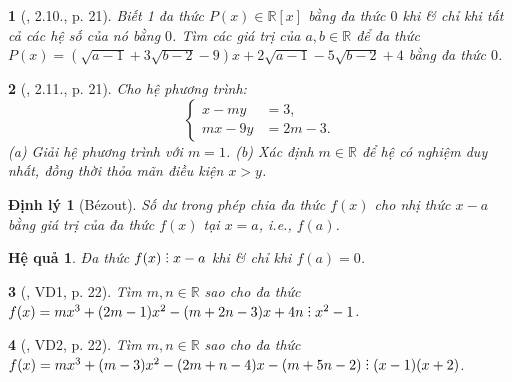 \documentclass{article}
\newtheorem{baitoan}{}
\newtheorem{dinhly}{Định lý}
\newtheorem{hequa}{Hệ quả}
\DeclareRobustCommand{\divby}{%
	\mathrel{\vbox{\baselineskip.65ex\lineskiplimit0pt\hbox{.}\hbox{.}\hbox{.}}}%
}
\begin{document}
\begin{baitoan}[\cite{Binh_boi_duong_Toan_9_tap_2}, 2.10., p. 21]
	Biết 1 đa thức $P(x)\in\mathbb{R}[x]$ bằng đa thức $0$ khi \& chỉ khi tất cả các hệ số của nó bằng $0$. Tìm các giá trị của $a,b\in\mathbb{R}$ để đa thức $P(x) = (\sqrt{a - 1} + 3\sqrt{b - 2} - 9)x + 2\sqrt{a - 1} - 5\sqrt{b - 2} + 4$ bằng đa thức $0$.
\end{baitoan}

\begin{baitoan}[\cite{Binh_boi_duong_Toan_9_tap_2}, 2.11., p. 21]
	Cho hệ phương trình:
	\begin{equation*}
		\left\{\begin{split}
			x - my &= 3,\\
			mx - 9y &= 2m - 3.
		\end{split}\right.
	\end{equation*}
	(a) Giải hệ phương trình với $m = 1$. (b) Xác định $m\in\mathbb{R}$ để hệ có nghiệm duy nhất, đồng thời thỏa mãn điều kiện $x > y$.
\end{baitoan}

\begin{dinhly}[B\'ezout]
	Số dư trong phép chia đa thức $f(x)$ cho nhị thức $x - a$ bằng giá trị của đa thức $f(x)$ tại $x = a$, i.e., $f(a)$.
\end{dinhly}

\begin{hequa}
	Đa thức $f(x)\divby x - a$ khi \& chỉ khi $f(a) = 0$.
\end{hequa}

\begin{baitoan}[\cite{Binh_boi_duong_Toan_9_tap_2}, VD1, p. 22]
	Tìm $m,n\in\mathbb{R}$ sao cho đa thức $f(x) = mx^3 + (2m - 1)x^2 - (m + 2n - 3)x + 4n\divby x^2 - 1$.
\end{baitoan}

\begin{baitoan}[\cite{Binh_boi_duong_Toan_9_tap_2}, VD2, p. 22]
	Tìm $m,n\in\mathbb{R}$ sao cho đa thức $f(x) = mx^3 + (m - 3)x^2 - (2m + n - 4)x - (m + 5n - 2)\divby(x - 1)(x + 2)$.
\end{baitoan}
\end{document}

